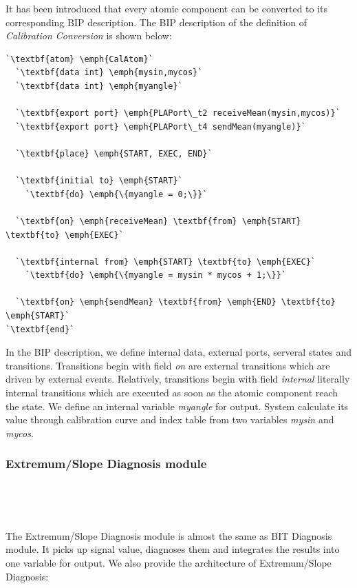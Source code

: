 It has been introduced that every atomic component can be converted to its corresponding BIP description. The BIP description of the definition of \emph{Calibration Conversion} is shown below:

\begin{lstlisting}
`\textbf{atom} \emph{CalAtom}`
  `\textbf{data int} \emph{mysin,mycos}`
  `\textbf{data int} \emph{myangle}`

  `\textbf{export port} \emph{PLAPort\_t2 receiveMean(mysin,mycos)}`
  `\textbf{export port} \emph{PLAPort\_t4 sendMean(myangle)}`

  `\textbf{place} \emph{START, EXEC, END}`
  
  `\textbf{initial to} \emph{START}`
    `\textbf{do} \emph{\{myangle = 0;\}}`

  `\textbf{on} \emph{receiveMean} \textbf{from} \emph{START} \textbf{to} \emph{EXEC}`

  `\textbf{internal from} \emph{START} \textbf{to} \emph{EXEC}`
    `\textbf{do} \emph{\{myangle = mysin * mycos + 1;\}}`

  `\textbf{on} \emph{sendMean} \textbf{from} \emph{END} \textbf{to} \emph{START}`
`\textbf{end}`
\end{lstlisting}

In the BIP description, we define internal data, external ports, serveral states and transitions. Transitions begin with field \emph{on} are external transitions which are driven by external events. Relatively, transitions begin with field \emph{internal} literally internal transitions which are executed as soon as the atomic component reach the state. We define an internal variable \emph{myangle} for output. System calculate its value through calibration curve and index table from two variables \emph{mysin} and \emph{mycos}.  

\subsubsection{Extremum/Slope Diagnosis module}

\ 

\ 

\noindent The Extremum/Slope Diagnosis module is almost the same as BIT Diagnosis module. It picks up signal value, diagnoses them and integrates the results into one variable for output. We also provide the architecture of Extremum/Slope Diagnosis:

